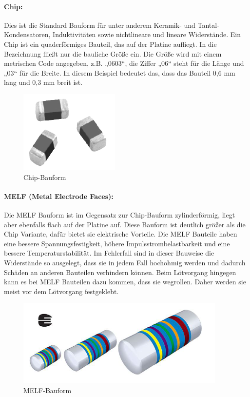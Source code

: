 \paragraph{Chip:}
Dies ist die Standard Bauform für unter anderem Keramik- und Tantal-Konden\-satoren, Induktivitäten sowie nichtlineare und lineare Widerstände.
Ein Chip ist ein quaderförmiges Bauteil, das auf der Platine aufliegt. In die Bezeichnung fließt nur die bauliche Größe ein.
Die Größe wird mit einem metrischen Code angegeben, z.B. „0603“, die Ziffer „06“ steht für die Länge und „03“ für die Breite.
In diesem Beispiel bedeutet das, dass das Bauteil 0,6 mm lang und 0,3 mm breit ist.
\begin{figure}[H]
	\centering
	\includegraphics{images/technische_grundlagen/chip.png}
	\caption{Chip-Bauform \cite[vgl.][]{vishay-chip}}
\end{figure}

\paragraph{MELF (Metal Electrode Faces):}
Die MELF Bauform ist im Gegensatz zur Chip-Bauform zylinderförmig, liegt aber ebenfalls flach auf der Platine auf.
Diese Bauform ist deutlich größer als die Chip Variante, dafür bietet sie elektrische Vorteile.
Die MELF Bauteile haben eine bessere Spannungsfestigkeit, höhere Impulsstrombelastbarkeit und eine bessere Temperaturstabilität.
Im Fehlerfall sind in dieser Bauweise die Widerstände so ausgelegt, dass sie in jedem Fall hochohmig werden und dadurch Schäden an anderen Bauteilen verhindern können.
Beim Lötvorgang hingegen kann es bei MELF Bauteilen dazu kommen, dass sie wegrollen. Daher werden sie meist vor dem Lötvorgang festgeklebt.
\begin{figure}[H]
	\centering
	\includegraphics{images/technische_grundlagen/melf.png}
	\caption{MELF-Bauform \cite[vgl.][]{vishay-melf}}
\end{figure}

